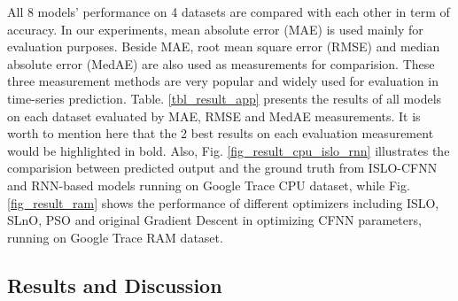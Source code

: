 \documentclass[a4paper,13pt,2p]{report}
\begin{document}
	All 8 models' performance on 4 datasets are compared with each other in term of accuracy. In our experiments, mean absolute error (MAE) is used mainly for evaluation purposes. Beside MAE, root mean square error (RMSE) and median absolute error	(MedAE) are also used as measurements for comparision. These three measurement methods are very popular and widely used for evaluation in time-series prediction. Table. \ref{tbl_result_app} presents the results of all models on each dataset evaluated by MAE, RMSE and MedAE measurements. It is worth to mention here that the 2 best results on each evaluation measurement would be highlighted in bold. Also, Fig. \ref{fig_result_cpu_islo_rnn} illustrates the comparision between predicted output and the ground truth from ISLO-CFNN and RNN-based models running on Google Trace CPU dataset, while Fig. \ref{fig_result_ram} shows the performance of different optimizers including ISLO, SLnO, PSO and original Gradient Descent in optimizing CFNN parameters, running on Google Trace RAM dataset.

\subsection{Results and Discussion}  
	
\end{document}
